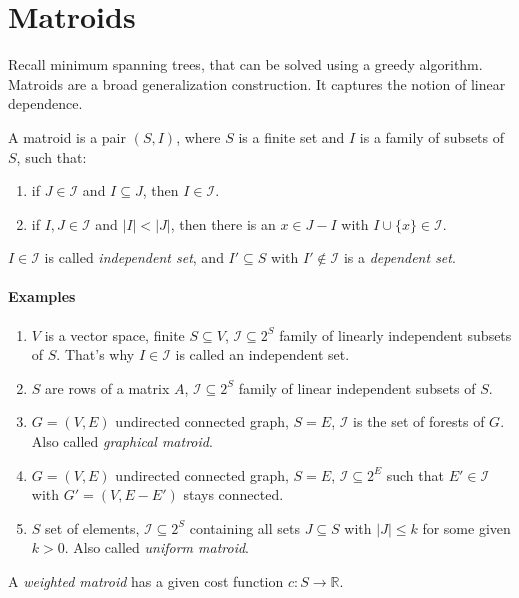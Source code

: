 \section{Matroids}

Recall minimum spanning trees, that can be solved using a greedy algorithm. Matroids are a broad generalization construction. It captures the notion of linear dependence.

\begin{mydefinition}
A matroid is a pair $(S, I)$, where $S$ is a finite set and $I$ is a family of subsets of $S$, such that:
\begin{enumerate}
\item if $J \in \mathcal{I}$ and $I \subseteq J$, then $I \in \mathcal{I}$.
\item if $I, J \in \mathcal{I}$ and $|I| < |J|$, then there is an $x \in J-I$ with $I \cup \{x\} \in \mathcal{I}$.
\end{enumerate}

$I \in \mathcal{I}$ is called \emph{independent set}, and $I' \subseteq S$ with $I' \notin \mathcal{I}$ is a \emph{dependent set}.
\end{mydefinition}

\paragraph{Examples}
\begin{enumerate}
\item $V$ is a vector space, finite $S \subseteq V$, $\mathcal{I} \subseteq 2^S$ family of linearly independent subsets of $S$. That's why $I \in \mathcal{I}$ is called an independent set.
\item $S$ are rows of a matrix $A$, $\mathcal{I} \subseteq 2^S$ family of linear independent subsets of $S$.
\item $G = (V, E)$ undirected connected graph, $S = E$, $\mathcal{I}$ is the set of forests of $G$. Also called \emph{graphical matroid}.
\item $G = (V, E)$ undirected connected graph, $S = E$, $\mathcal{I} \subseteq 2^E$ such that $E' \in \mathcal{I}$ with $G' = (V, E-E')$ stays connected.
\item $S$ set of elements, $\mathcal{I} \subseteq 2^S$ containing all sets $J \subseteq S$ with $|J| \le k$ for some given $k > 0$. Also called \emph{uniform matroid}.
\end{enumerate}

\begin{mydefinition}
A \emph{weighted matroid} has a given cost function $c: S \rightarrow \mathbb{R}$.
\end{mydefinition}

